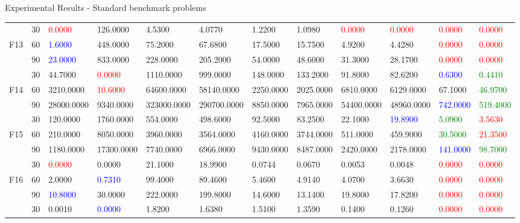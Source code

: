 \documentclass [9pt,times] {beamer}
\begin{document}
\begin{frame}[plain]{Experimental Results - Standard benchmark problems}
\begin{center}
\begin{tabular}{p{0.08in} | p{0.09in} | p{0.25in} |  p{0.23in} |  p{0.25in}|  p{0.25in} |  p{0.25in} | p{0.25in} |  p{0.25in} | p{0.25in} |  p{0.25in} |  p{0.25in}}
\hline																							
	&	30	&\textcolor{red}{	0.0000	}&	126.0000	&	4.5300	&	4.0770	&	1.2200	&	1.0980	&\textcolor{red}{	0.0000	}&\textcolor{red}{	0.0000	}&\textcolor{red}{	0.0000	}&\textcolor{red}{	0.0000	}\\
F13	&	60	&\textcolor{blue}{	1.6000	}&	448.0000	&	75.2000	&	67.6800	&	17.5000	&	15.7500	&	4.9200	&	4.4280	&\textcolor{red}{	0.0000	}&\textcolor{red}{	0.0000	}\\
	&	90	&\textcolor{blue}{	23.0000	}&	833.0000	&	228.0000	&	205.2000	&	54.0000	&	48.6000	&	31.3000	&	28.1700	&\textcolor{red}{	0.0000	}&\textcolor{red}{	0.0000	}\\
\hline																							
	&	30	&	44.7000	&\textcolor{red}{	0.0000	}&	1110.0000	&	999.0000	&	148.0000	&	133.2000	&	91.8000	&	82.6200	&\textcolor{blue}{	0.6300	}&\textcolor{green}{	0.4410	}\\
F14	&	60	&	3210.0000	&\textcolor{red}{	10.6000	}&	64600.0000	&	58140.0000	&	2250.0000	&	2025.0000	&	6810.0000	&	6129.0000	&	67.1000	&\textcolor{green}{	46.9700	}\\
	&	90	&	28000.0000	&	9340.0000	&	323000.0000	&	290700.0000	&	8850.0000	&	7965.0000	&	54400.0000	&	48960.0000	&\textcolor{blue}{	742.0000	}&\textcolor{green}{	519.4000	}\\
\hline																							
	&	30	&	120.0000	&	1760.0000	&	554.0000	&	498.6000	&	92.5000	&	83.2500	&	22.1000	&\textcolor{blue}{	19.8900	}&\textcolor{green}{	5.0900	}&\textcolor{red}{	3.5630	}\\
F15	&	60	&	210.0000	&	8050.0000	&	3960.0000	&	3564.0000	&	4160.0000	&	3744.0000	&	511.0000	&	459.9000	&\textcolor{green}{	30.5000	}&\textcolor{red}{	21.3500	}\\
	&90&	1180.0000	&	17300.0000	&	7740.0000	&	6966.0000	&	9430.0000	&	8487.0000	&	2420.0000	&	2178.0000	&\textcolor{blue}{	141.0000	}&\textcolor{green}{	98.7000	}\\
\hline																							
	&	30	&\textcolor{red}{	0.0000	}&	0.0000	&	21.1000	&	18.9900	&	0.0744	&	0.0670	&	0.0053	&	0.0048	&\textcolor{red}{	0.0000	}&\textcolor{red}{	0.0000	}\\
F16	&	60	&	2.0000	&\textcolor{blue}{	0.7310	}&	99.4000	&	89.4600	&	5.4600	&	4.9140	&	4.0700	&	3.6630	&\textcolor{red}{	0.0000	}&\textcolor{red}{	0.0000	}\\
	&	90	&\textcolor{blue}{	10.8000	}&	30.0000	&	222.0000	&	199.8000	&	14.6000	&	13.1400	&	19.8000	&	17.8200	&\textcolor{red}{	0.0000	}&\textcolor{red}{	0.0000	}\\
\hline																							
	&	30	&	0.0010	&\textcolor{blue}{	0.0000	}&	1.8200	&	1.6380	&	1.5100	&	1.3590	&	0.1400	&	0.1260	&\textcolor{red}{	0.0000	}&\textcolor{red}{	0.0000	}\\

\end{tabular}
\end{center}
\end{frame}
\end{document}
